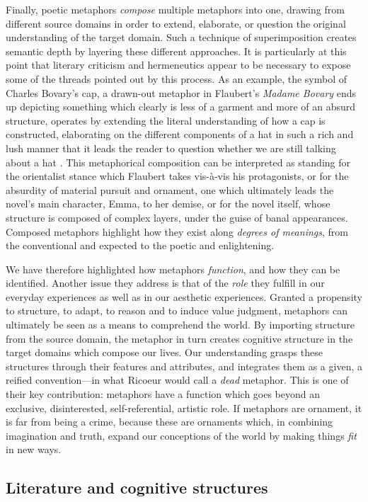 Finally, poetic metaphors \emph{compose} multiple metaphors into one, drawing from different source domains in order to extend, elaborate, or question the original understanding of the target domain. Such a technique of superimposition creates semantic depth by layering these different approaches. It is particularly at this point that literary criticism and hermeneutics appear to be necessary to expose some of the threads pointed out by this process. As an example, the symbol of Charles Bovary's cap, a drawn-out metaphor in Flaubert's \emph{Madame Bovary} ends up depicting something which clearly is less of a garment and more of an absurd structure, operates by extending the literal understanding of how a cap is constructed, elaborating on the different components of a hat in such a rich and lush manner that it leads the reader to question whether we are still talking about a hat \citep{nabokov_lectures_1980}. This metaphorical composition can be interpreted as standing for the orientalist stance which Flaubert takes vis-à-vis his protagonists, or for the absurdity of material pursuit and ornament, one which ultimately leads the novel's main character, Emma, to her demise, or for the novel itself, whose structure is composed of complex layers, under the guise of banal appearances. Composed metaphors highlight how they exist along \emph{degrees of meanings}, from the conventional and expected to the poetic and enlightening.

We have therefore highlighted how metaphors \emph{function}, and how they can be identified. Another issue they address is that of the \emph{role} they fulfill in our everyday experiences as well as in our aesthetic experiences. Granted a propensity to structure, to adapt, to reason and to induce value judgment, metaphors can ultimately be seen as a means to comprehend the world. By importing structure from the source domain, the metaphor in turn creates cognitive structure in the target domains which compose our lives. Our understanding grasps these structures through their features and attributes, and integrates them as a given, a reified convention—in what Ricoeur would call a \emph{dead} metaphor. This is one of their key contribution: metaphors have a function which goes beyond an exclusive, disinterested, self-referential, artistic role. If metaphors are ornament, it is far from being a crime, because these are ornaments which, in combining imagination and truth, expand our conceptions of the world by making things \emph{fit} in new ways.

\subsection{Literature and cognitive structures}
\label{subsec:literature-cognition}


